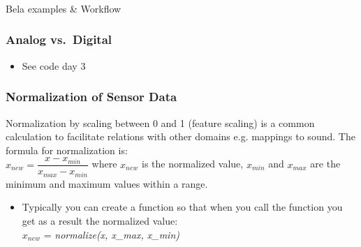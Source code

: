 \documentclass[screen, aspectratio=169]{beamer}
\begin{document}
%
\usebackgroundtemplate{}
\begin{frame}
\frametitle{}
{\huge Bela examples \& Workflow}
\end{frame}
%
%
\begin{frame}
\frametitle{Analog vs.\ Digital}
       \begin{itemize}
     \item See code day 3
     \end{itemize}
\end{frame}
%
\begin{frame}
  \frametitle{Normalization of Sensor Data}
  {\scriptsize Normalization by scaling between 0 and 1 (feature scaling) is a common calculation to facilitate relations with other domains e.g. mappings to sound. The formula for normalization is:\\
  $x_{new} = \dfrac{x-x_{min}}{x_{max}-x_{min}}$
  where $x_{new}$ is the normalized value, $x_{min}$ and $x_{max}$ are the minimum and maximum values within a range. 
    \begin{itemize}
    	\item Typically you can create a function so that when you call the function you get as a result the normalized value: \\
	$x_{new}$ = \emph{normalize(x, x\_{max}, x\_{min})}
    \end{itemize}
    }
\end{frame}
\end{document}
